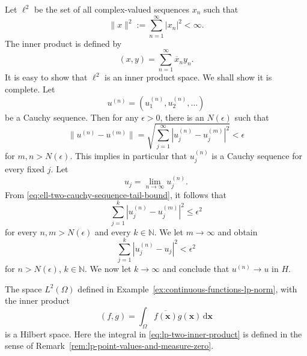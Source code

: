 \begin{Example}
\label{ex:ell-two-hilbert-space}
Let $\ell^2$ be the set of all complex-valued sequences $x_n$ such that
\begin{equation}\label{eq:ell-two-sequence-square-norm}
\|x\|^2:=\sum_{n=1}^\infty|x_n|^2<\infty.
\end{equation}
The inner product is defined by
\begin{equation}\label{eq:ell-two-sequence-inner-product}
(x,y)=\sum_{n=1}^\infty\overline x_ny_n.
\end{equation}
It is easy to show that $\ell^2$ is an inner product space. We shall show it is complete. Let
\begin{equation}\label{eq:ell-two-cauchy-sequence-components}
u^{(n)}=(u_1^{(n)},u_2^{(n)},\ldots)
\end{equation}
be a Cauchy sequence. Then for any $\epsilon>0$, there is an $N(\epsilon)$ such that
\begin{equation}\label{eq:ell-two-cauchy-sequence-tail-bound}
\|u^{(n)}-u^{(m)}\|=\sqrt{\sum_{j=1}^\infty|u_j^{(n)}-u_j^{(m)}|^2}<\epsilon
\end{equation}
for $m,n>N(\epsilon)$. This implies in particular that $u_j^{(n)}$ is a Cauchy sequence for every fixed $j$. Let
\begin{equation}\label{eq:ell-two-coordinatewise-limit}
u_j=\lim_{n\to\infty}u_j^{(n)}.
\end{equation}
From \eqref{eq:ell-two-cauchy-sequence-tail-bound}, it follows that
\begin{equation}\label{eq:ell-two-finite-partial-sum-cauchy-bound}
\sum_{j=1}^k|u_j^{(n)}-u_j^{(m)}|^2\leq\epsilon^2
\end{equation}
for every $n,m>N(\epsilon)$ and every $k\in\mathbb{N}$. We let $m\to\infty$ and obtain
\begin{equation}\label{eq:ell-two-finite-partial-sum-limit-bound}
\sum_{j=1}^k|u_j^{(n)}-u_j|^2<\epsilon^2
\end{equation}
for $n>N(\epsilon)$, $k\in\mathbb{N}$. We now let $k\to\infty$ and conclude that $u^{(n)}\to u$ in $H$.
\end{Example}

\begin{Example}
\label{ex:lp-two-hilbert-space}
The space $L^2(\Omega)$ defined in Example~\ref{ex:continuous-functions-lp-norm}, with the inner product
\begin{equation}\label{eq:lp-two-inner-product}
(f,g)=\int_\Omega\overline{f(\bm{x})}g(\bm{x})\,\mathrm{d}\bm{x}
\end{equation}
is a Hilbert space. Here the integral in \eqref{eq:lp-two-inner-product} is defined in the sense of Remark~\ref{rem:lp-point-values-and-measure-zero}.
\end{Example}

